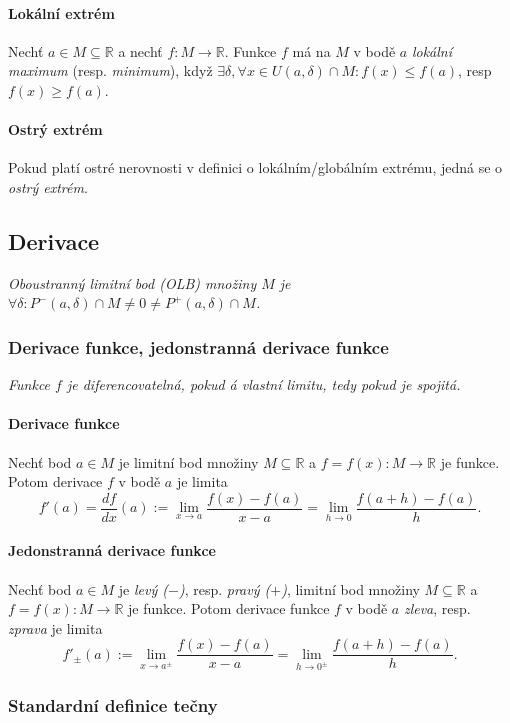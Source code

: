 \documentclass[10pt,a4paper]{article}
\newcommand{\R}{{\mathbb{R}}}
\begin{document}
\paragraph*{Lokální extrém} Nechť $a\in M \subseteq \R$ a nechť $f:M\to \R$. Funkce $f$ má na $M$ v bodě $a$ \textit{lokální maximum} (resp. \textit{minimum}), když $\exists \delta, \forall x\in U(a, \delta) \cap M: f(x)\leq f(a)$, resp $f(x) \geq f(a)$.

\paragraph*{Ostrý extrém} Pokud platí ostré nerovnosti v definici o lokálním/globálním extrému, jedná se o \textit{ostrý extrém}.

\subsection{Derivace}

\textit{Oboustranný limitní bod (OLB) množiny $M$ je $\forall \delta: P^-(a,\delta) \cap M \neq 0 \neq P^+(a, \delta) \cap M$.}

\subsubsection{Derivace funkce, jedonstranná derivace funkce}
\textit{Funkce $f$ je diferencovatelná, pokud á vlastní limitu, tedy pokud je spojitá.}

\paragraph*{Derivace funkce} Nechť bod $a\in M$ je limitní bod množiny $M \subseteq \R$ a $f = f(x): M\to \R$ je funkce. Potom derivace $f$ v bodě $a$ je limita \[
    f'(a) = \frac{df}{dx}(a) := \lim_{x\to a}\frac{f(x) - f(a)}{x-a} = \lim_{h\to 0}\frac{f(a+h)-f(a)}{h}. \]
\paragraph*{Jedonstranná derivace funkce}
Nechť bod $a\in M$ je \textit{levý ($-$)}, resp. \textit{pravý ($+$)}, limitní bod množiny $M \subseteq \R$ a $f = f(x): M\to \R$ je funkce. 
Potom derivace funkce $f$ v bodě $a$ \textit{zleva}, resp. \textit{zprava} je limita \[
    f'_{\pm}(a) := \lim_{x\to a^{\pm}}\frac{f(x) - f(a)}{x-a} = \lim_{h\to 0^\pm}\frac{f(a+h)-f(a)}{h}.
\]

\subsubsection{Standardní definice tečny}
\end{document}
